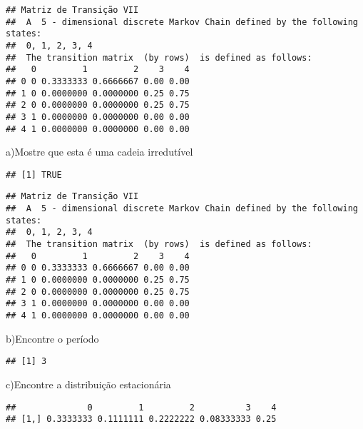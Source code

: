 \documentclass[
]{article}
\begin{document}
\begin{verbatim}
## Matriz de Transição VII 
##  A  5 - dimensional discrete Markov Chain defined by the following states: 
##  0, 1, 2, 3, 4 
##  The transition matrix  (by rows)  is defined as follows: 
##   0         1         2    3    4
## 0 0 0.3333333 0.6666667 0.00 0.00
## 1 0 0.0000000 0.0000000 0.25 0.75
## 2 0 0.0000000 0.0000000 0.25 0.75
## 3 1 0.0000000 0.0000000 0.00 0.00
## 4 1 0.0000000 0.0000000 0.00 0.00
\end{verbatim}

a)Mostre que esta é uma cadeia irredutível

\begin{verbatim}
## [1] TRUE
\end{verbatim}

\begin{verbatim}
## Matriz de Transição VII 
##  A  5 - dimensional discrete Markov Chain defined by the following states: 
##  0, 1, 2, 3, 4 
##  The transition matrix  (by rows)  is defined as follows: 
##   0         1         2    3    4
## 0 0 0.3333333 0.6666667 0.00 0.00
## 1 0 0.0000000 0.0000000 0.25 0.75
## 2 0 0.0000000 0.0000000 0.25 0.75
## 3 1 0.0000000 0.0000000 0.00 0.00
## 4 1 0.0000000 0.0000000 0.00 0.00
\end{verbatim}

b)Encontre o período

\begin{verbatim}
## [1] 3
\end{verbatim}

c)Encontre a distribuição estacionária

\begin{verbatim}
##              0         1         2          3    4
## [1,] 0.3333333 0.1111111 0.2222222 0.08333333 0.25
\end{verbatim}
\end{document}
